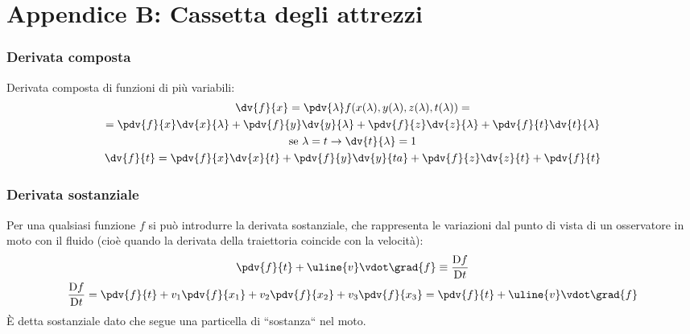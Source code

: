 %
\chapter{Appendice B: Cassetta degli attrezzi}

\subsection*{Derivata composta}
Derivata composta di funzioni di più variabili:
	\begin{equation*}
		\begin{gathered}
			\dv{f}{x} = \pdv{\lambda} f(x(\lambda), y(\lambda), z(\lambda), t(\lambda)) = \\
			= \pdv{f}{x} \dv{x}{\lambda} + \pdv{f}{y} \dv{y}{\lambda} + \pdv{f}{z} \dv{z}{\lambda} + \pdv{f}{t} \dv{t}{\lambda}\\
			\text{se $\lambda = t \rightarrow \dv{t}{\lambda} = 1$}\\
			\dv{f}{t} = \pdv{f}{x} \dv{x}{t} + \pdv{f}{y} \dv{y}{ta} + \pdv{f}{z} \dv{z}{t} + \pdv{f}{t}
		\end{gathered}
	\end{equation*}

\subsection*{Derivata sostanziale}
Per una qualsiasi funzione $f$ si può introdurre la derivata sostanziale, che rappresenta le variazioni dal punto di vista di un osservatore in moto con il fluido (cioè quando la derivata della traiettoria coincide con la velocità):
	\begin{equation*}
		\begin{gathered}
			\pdv{f}{t} + \uline{v} \vdot \grad{f} \equiv \frac{\mathrm{D} f}{\mathrm{D} t}\\
			\frac{\mathrm{D} f}{\mathrm{D} t} = \pdv{f}{t} + v_1 \pdv{f}{x_1} + v_2 \pdv{f}{x_2} + v_3 \pdv{f}{x_3} = \pdv{f}{t} + \uline{v} \vdot \grad{f}
		\end{gathered}
	\end{equation*}
È detta sostanziale dato che segue una particella di ``sostanza`` nel moto.

